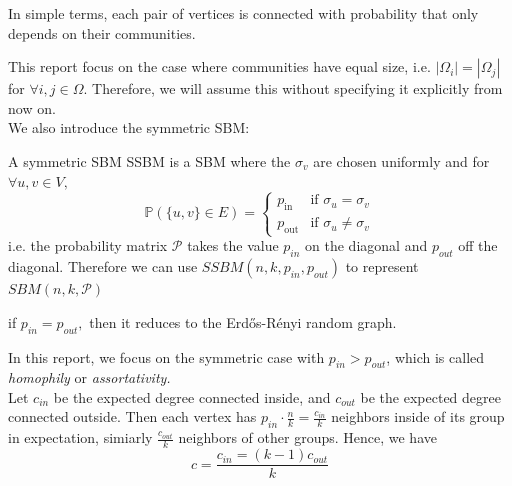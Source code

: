 \begin{remark}
    In simple terms, each pair of vertices is connected with probability that only depends on their communities. 
\end{remark}
This report focus on the case where communities have equal size, i.e. $|\Omega_i|=|\Omega_j|$ for $\forall i, j\in\Omega.$ Therefore, we will assume this without specifying it explicitly from now on.\\

We also introduce the symmetric SBM:
\vspace{-2mm}
\begin{definition}
A symmetric SBM SSBM is a SBM where the $\sigma_v$ are chosen uniformly and for $\forall u, v\in V,$ \begin{equation}
\mathbb{P}\left(\{u,v\}\in E\right) = 
    \begin{cases} 
    p_{\text{in}} & \text{if } \sigma_u = \sigma_v \\
    p_{\text{out}} & \text{if } \sigma_u \neq \sigma_v 
    \end{cases}
\end{equation}
i.e. the probability matrix $\mathcal{P}$ takes the value $p_{in}$ on the diagonal and $p_{out}$ off the diagonal. Therefore we can use $SSBM(n, k, p_{in}, p_{out})$ to represent $SBM(n, k, \mathcal{P})$
\end{definition}
\begin{remark}
    if $p_{in}=p_{out},$ then it reduces to the Erd\H{o}s-R\'{e}nyi random graph.
\end{remark}
In this report, we focus on the symmetric case with $p_{in}>p_{out}$, which is called \textit{homophily} or \textit{assortativity.}\\

Let $c_{in}$ be the expected degree connected inside, and $c_{out}$ be the expected degree connected outside. Then each vertex has $p_{in}\cdot \frac{n}{k}=\frac{c_{in}}{k}$ neighbors inside of its group in expectation, simiarly $\frac{c_{out}}{k}$ neighbors of other groups. Hence, we have\begin{equation}
    c=\frac{c_{in}=(k-1)c_{out}}{k}
\end{equation}


